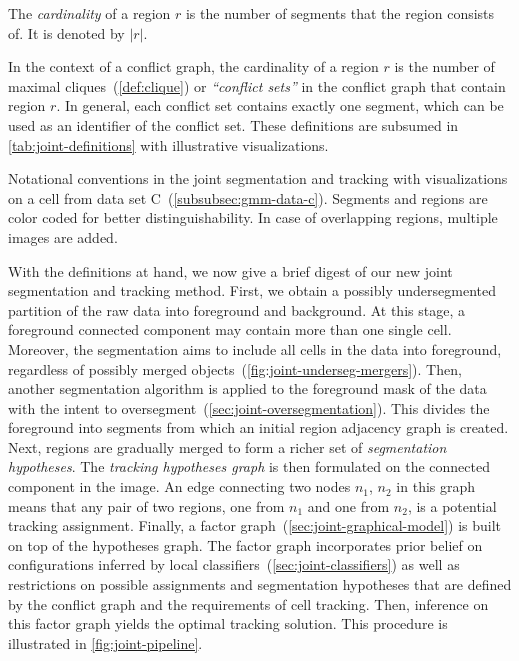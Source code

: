 \begin{mydef}
    \label{def:joint-cardinality}
    The \emph{cardinality} of a region $r$ is the number of segments that the region consists of. It
    is denoted by $|r|$.
\end{mydef}
In the context of a conflict graph, the cardinality of a region $r$ is the number of maximal
cliques~(\cref{def:clique}) or \emph{``conflict sets''} in the conflict graph that contain region
$r$. In general, each conflict set contains exactly one segment, which can be used as an identifier
of the conflict set. These definitions are subsumed in \cref{tab:joint-definitions} with
illustrative visualizations.  \newlength\tablenormaltext
\settototalheight{}
\begin{table}
    \centering
    \scalebox{0.85}{
        
    }
    \caption[Notational conventions in the joint segmentation and tracking]{Notational conventions in the joint segmentation and
        tracking with visualizations on a cell from data set
        C~(\cref{subsubsec:gmm-data-c}). Segments and regions are color coded for better
        distinguishability. In case of overlapping regions, multiple images are added.}
    \label{tab:joint-definitions}
\end{table}

With the definitions at hand, we now give a brief digest of our new joint segmentation and tracking
method. First, we obtain a possibly undersegmented partition of the raw data into foreground and
background. At this stage, a foreground connected component may contain more than one single
cell. Moreover, the segmentation aims to include all cells in the data into foreground, regardless
of possibly merged objects~(\cf \cref{fig:joint-underseg-mergers}). Then, another segmentation
algorithm is applied to the foreground mask of the data with the intent to
oversegment~(\cref{sec:joint-oversegmentation}). This divides the foreground into segments from which an
initial region adjacency graph is created. Next, regions are gradually merged to form a richer set of
\emph{segmentation hypotheses}. The \emph{tracking hypotheses graph} is then formulated on the
connected component in the image. An edge connecting two nodes $n_1$, $n_2$ in this graph means that
any pair of two regions, one from $n_1$ and one from $n_2$, is a potential tracking
assignment. Finally, a factor graph~(\cref{sec:joint-graphical-model}) is built on top of the
hypotheses graph. The factor graph incorporates prior belief on configurations inferred by local
classifiers~(\cref{sec:joint-classifiers}) as well as restrictions on possible assignments and
segmentation hypotheses that are defined by the conflict graph and the requirements of cell
tracking. Then, inference on this factor graph yields the optimal tracking solution. This procedure
is illustrated in \cref{fig:joint-pipeline}.

